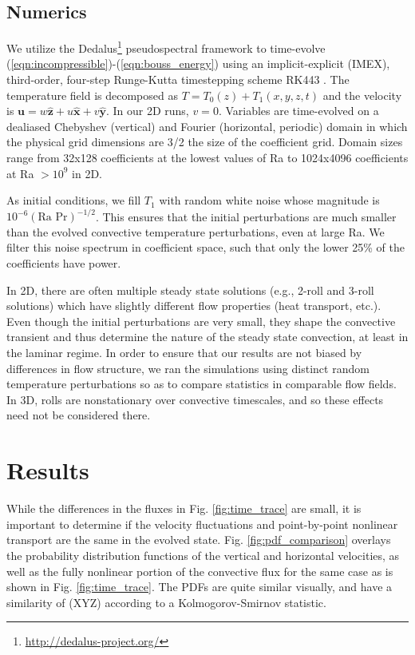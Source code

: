 \documentclass[aps, pre, onecolumn, nofootinbib, notitlepage, groupedaddress, amsfonts, amssymb, amsmath, longbibliography]{revtex4-1}
\begin{document}
\subsection{Numerics}
We utilize the 
Dedalus\footnote{\url{http://dedalus-project.org/}} 
pseudospectral framework \cite{burns&all2016} to time-evolve  
(\ref{eqn:incompressible})-(\ref{eqn:bouss_energy}) 
using an implicit-explicit (IMEX), third-order, four-step 
Runge-Kutta timestepping scheme RK443 \cite{ascher&all1997}.  
The temperature field is decomposed as $T = T_0(z) + T_1(x, y, z, t)$
and the velocity is $\bm{u} = w\bm{\hat{z}} + u\bm{\hat{x}} + v\bm{\hat{y}}$.
In our 2D runs, $v = 0$.
Variables are time-evolved on a dealiased Chebyshev (vertical)
and Fourier (horizontal, periodic) domain in which the
physical grid dimensions are 3/2 the size of the coefficient grid.  
Domain sizes range from
32x128 coefficients at the lowest values of 
Ra to 1024x4096 coefficients at Ra $> 10^{9}$ in 2D.

As initial conditions, we fill $T_1$ with
random white noise whose magnitude is $10^{-6}(\text{Ra Pr})^{-1/2}$.
This ensures that the initial perturbations are much smaller than the
evolved convective temperature perturbations, even at large Ra.
We filter this noise spectrum in coefficient space, 
such that only the lower 25\% of the coefficients
have power.

In 2D, there are often multiple steady state solutions (e.g., 2-roll and 3-roll
solutions) which have slightly different flow properties (heat transport, etc.).
Even though the initial perturbations are very small, they shape the convective
transient and thus determine the nature of the steady state convection, at least in
the laminar regime.  In order to ensure that our results are not biased by differences
in flow structure, we ran the simulations using distinct random temperature perturbations
so as to compare statistics in comparable flow fields.  In 3D, rolls are nonstationary over
convective timescales, and so these effects need not be considered there.

\section{Results}
While the differences in the fluxes in Fig. \ref{fig:time_trace} are small, it is important
to determine if the velocity fluctuations and point-by-point nonlinear transport are the same
in the evolved state.  Fig. \ref{fig:pdf_comparison} overlays the probability distribution functions
of the vertical and horizontal velocities, as well as the fully nonlinear portion of the convective
flux for the same case as is shown in Fig. \ref{fig:time_trace}.  The PDFs are quite similar visually,
and have a similarity of (XYZ) according to a Kolmogorov-Smirnov statistic.
\end{document}
